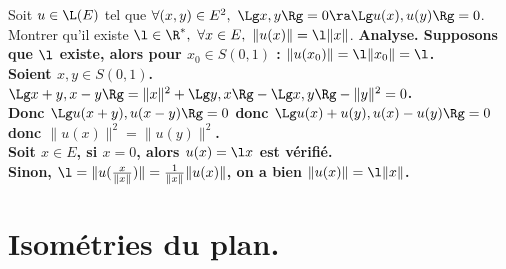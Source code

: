 \documentclass[11pt]{article}
\begin{document}
\begin{ex}{}{}
    Soit $u\in\L(E)$ tel que $\forall (x,y) \in E^2, ~ \Lg x,y \Rg = 0 \ra \Lg u(x), u(y) \Rg = 0$.\\
    Montrer qu'il existe $\l\in\R^*, ~ \forall x \in E, ~ \|u(x)\|=\l\|x\|$.
    \tcblower
    \bf{Analyse.} Supposons que $\l$ existe, alors pour $x_0\in S(0,1)$ : $\|u(x_0)\|=\l\|x_0\|=\l$.\\
    Soient $x,y \in S(0,1)$. $\Lg x+y, x-y \Rg = \|x\|^2+\Lg y,x \Rg - \Lg x,y\Rg - \|y\|^2 = 0$.\\
    Donc $\Lg u(x+y), u(x-y) \Rg = 0$ donc $\Lg u(x) + u(y), u(x) - u(y) \Rg = 0$ donc $\|u(x)\|^2=\|u(y)\|^2$.\\
    Soit $x\in E$, si $x=0$, alors $u(x)=\l x$ est vérifié.\\
    Sinon, $\l = \|u(\frac{x}{\|x\|})\|=\frac{1}{\|x\|}\|u(x)\|$, on a bien $\|u(x)\|=\l\|x\|$.
\end{ex}

\section{Isométries du plan.}
\end{document}

